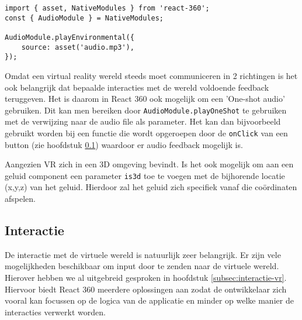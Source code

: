 \begin{lstlisting}[frame=single, caption=Voorbeeld van geluid in React 360]
import { asset, NativeModules } from 'react-360';
const { AudioModule } = NativeModules;

AudioModule.playEnvironmental({
	source: asset('audio.mp3'),
});
\end{lstlisting}

Omdat een virtual reality wereld steeds moet communiceren in 2 richtingen is het ook belangrijk dat bepaalde interacties met de wereld voldoende feedback teruggeven. Het is daarom in React 360 ook mogelijk om een 'One-shot audio' gebruiken. Dit kan men bereiken door \lstinline[basicstyle=\ttfamily\color{red}]|AudioModule.playOneShot| te gebruiken met de verwijzing naar de audio file als parameter. Het kan dan bijvoorbeeld gebruikt worden bij een functie die wordt opgeroepen door de \lstinline[basicstyle=\ttfamily\color{red}]|onClick| van een button (zie hoofdstuk \ref{subsec:input-vr}) waardoor er audio feedback mogelijk is.

Aangezien VR zich in een 3D omgeving bevindt. Is het ook mogelijk om aan een geluid component een parameter \lstinline[basicstyle=\ttfamily\color{red}]|is3d| toe te voegen met de bijhorende locatie (x,y,z) van het geluid. Hierdoor zal het geluid zich specifiek vanaf die coördinaten afspelen.


\subsection{Interactie}
\label{subsec:input-vr}
De interactie met de virtuele wereld is natuurlijk zeer belangrijk. Er zijn vele mogelijkheden beschikbaar om input door te zenden naar de virtuele wereld. Hierover hebben we al uitgebreid gesproken in hoofdstuk \ref{subsec:interactie-vr}. Hiervoor biedt React 360 meerdere oplossingen aan zodat de ontwikkelaar zich vooral kan focussen op de logica van de applicatie en minder op welke manier de interacties verwerkt worden.

